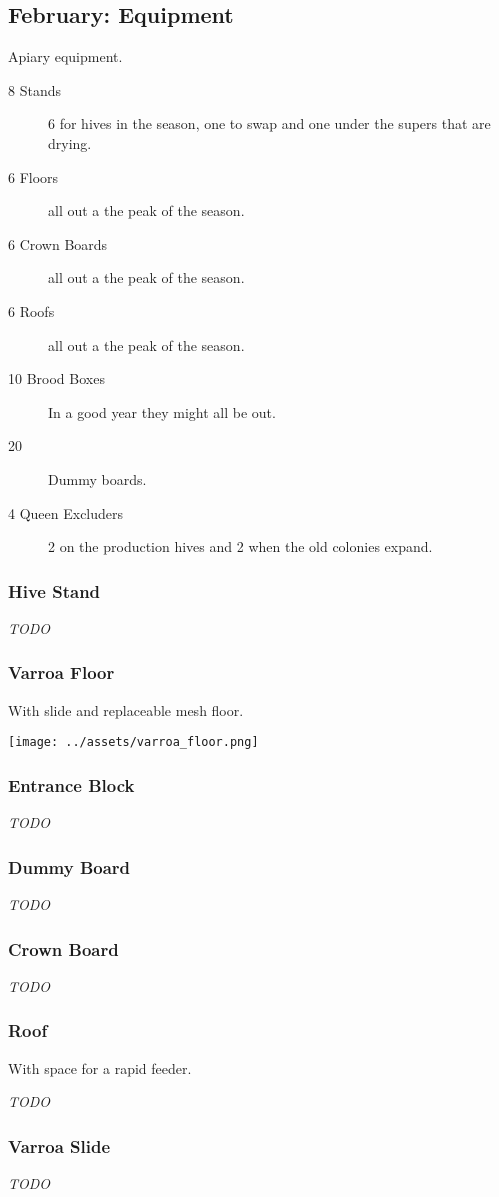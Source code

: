 \subsection{February: Equipment}

Apiary equipment.

\begin{description}
    \item[8 Stands] 6 for hives in the season, one to swap and one under the supers that are drying.
    \item[6 Floors] all out a the peak of the season.
    \item[6 Crown Boards] all out a the peak of the season.
    \item[6 Roofs] all out a the peak of the season.
    \item[10 Brood Boxes] In a good year they might all be out.
    \item[20] Dummy boards.
    \item[4 Queen Excluders] 2 on the production hives and 2 when the old colonies expand.
\end{description}

\subsubsection{Hive Stand}

\emph{TODO}

\subsubsection{Varroa Floor}

With slide and replaceable mesh floor.

\texttt{[image: ../assets/varroa\_floor.png]}

\subsubsection{Entrance Block}

\emph{TODO}

\subsubsection{Dummy Board}

\emph{TODO}

\subsubsection{Crown Board}

\emph{TODO}

\subsubsection{Roof}

With space for a rapid feeder.

\emph{TODO}

\subsubsection{Varroa Slide}

\emph{TODO}

